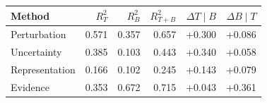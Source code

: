 \begin{tabular}{lrrrrr}
\toprule
Method & $R^2_T$ & $R^2_B$ & $R^2_{T+B}$ & $\Delta T\mid B$ & $\Delta B\mid T$ \\
\midrule
Perturbation & 0.571 & 0.357 & 0.657 & +0.300 & +0.086 \\
Uncertainty & 0.385 & 0.103 & 0.443 & +0.340 & +0.058 \\
Representation & 0.166 & 0.102 & 0.245 & +0.143 & +0.079 \\
Evidence & 0.353 & 0.672 & 0.715 & +0.043 & +0.361 \\
\bottomrule
\end{tabular}
